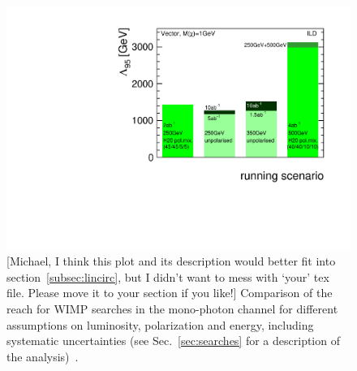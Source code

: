 \begin{figure}
\centering
\includegraphics[width=0.95\linewidth]{./chapters/figures/manhattan_vector_v3.pdf}
		
\caption{{\color{red}[Michael, I think this plot and its description would better fit into section~\ref{subsec:lincirc}, but I didn't want to mess with `your' tex file. Please move it to your section if you like!]} Comparison of the reach for WIMP searches in the mono-photon channel for different assumptions on luminosity, polarization and energy, including systematic uncertainties (see Sec.~\ref{sec:searches} for a description of the analysis)~\cite{Habermehl:417605}. }
\label{fig:polWIMPmanhattans}
\end{figure}




